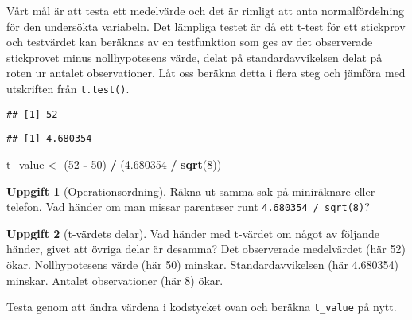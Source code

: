 \documentclass[
]{book}
\newenvironment{Shaded}{\begin{snugshade}}{\end{snugshade}}
\newcommand{\DecValTok}[1]{\textcolor[rgb]{0.00,0.00,0.81}{#1}}
\newcommand{\FloatTok}[1]{\textcolor[rgb]{0.00,0.00,0.81}{#1}}
\newcommand{\FunctionTok}[1]{\textcolor[rgb]{0.13,0.29,0.53}{\textbf{#1}}}
\newcommand{\NormalTok}[1]{#1}
\newcommand{\OtherTok}[1]{\textcolor[rgb]{0.56,0.35,0.01}{#1}}
\newcommand{\SpecialCharTok}[1]{\textcolor[rgb]{0.81,0.36,0.00}{\textbf{#1}}}
\theoremstyle{definition}
\theoremstyle{definition}
\theoremstyle{definition}
\newtheorem{exercise}{Uppgift}[chapter]
\theoremstyle{definition}
\theoremstyle{remark}
\begin{document}
Vårt mål är att testa ett medelvärde och det är rimligt att anta normalfördelning för den undersökta variabeln. Det lämpliga testet är då ett t-test för ett stickprov och testvärdet kan beräknas av en testfunktion som ges av det observerade stickprovet minus nollhypotesens värde, delat på standardavvikelsen delat på roten ur antalet observationer. Låt oss beräkna detta i flera steg och jämföra med utskriften från \texttt{t.test()}.

\begin{Shaded}
\end{Shaded}

\begin{verbatim}
## [1] 52
\end{verbatim}

\begin{Shaded}
\end{Shaded}

\begin{verbatim}
## [1] 4.680354
\end{verbatim}

\begin{Shaded}
\begin{Highlighting}[]
\NormalTok{t\_value }\OtherTok{\textless{}{-}}\NormalTok{ (}\DecValTok{52} \SpecialCharTok{{-}} \DecValTok{50}\NormalTok{) }\SpecialCharTok{/}\NormalTok{ (}\FloatTok{4.680354} \SpecialCharTok{/} \FunctionTok{sqrt}\NormalTok{(}\DecValTok{8}\NormalTok{))}
\end{Highlighting}
\end{Shaded}

\begin{exercise}[Operationsordning]
Räkna ut samma sak på miniräknare eller telefon. Vad händer om man missar parenteser runt \texttt{4.680354\ /\ sqrt(8)}?
\end{exercise}

\begin{exercise}[t-värdets delar]
Vad händer med t-värdet om något av följande händer, givet att övriga delar är desamma? Det observerade medelvärdet (här 52) ökar. Nollhypotesens värde (här 50) minskar. Standardavvikelsen (här 4.680354) minskar. Antalet observationer (här 8) ökar.

Testa genom att ändra värdena i kodstycket ovan och beräkna \texttt{t\_value} på nytt.
\end{exercise}
\end{document}
